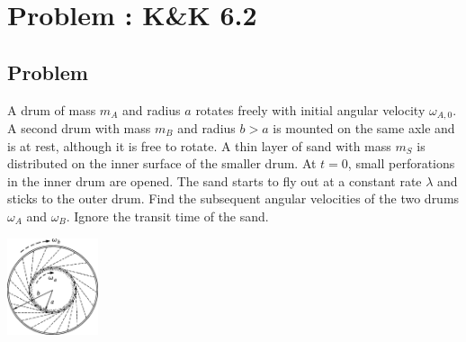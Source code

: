 \documentclass[solutions]{esg8012pset}
\begin{document}
\section{Problem \thesection: K\&K 6.2}
\subsection{Problem}
  A drum of mass $m_A$ and radius $a$ rotates freely with initial angular velocity $\omega_{A,0}$. A second drum with mass $m_B$ and radius $b > a$ is mounted on the same axle and is at rest, although it is free to rotate. A thin layer of sand with mass $m_S$ is distributed on the inner surface of the smaller drum. At $t = 0$, small perforations in the inner drum are opened. The sand starts to fly out at a constant rate $\lambda$ and sticks to the outer drum. Find the subsequent angular velocities of the two drums $\omega_A$ and $\omega_B$. Ignore the transit time of the sand.
  \begin{center}\includegraphics[width=0.2\textwidth]{ps08_1}\end{center}
\end{document}
